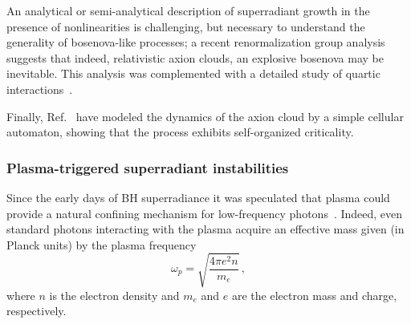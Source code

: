 \documentclass[11pt]{article}
\numberwithin{equation}{section} %
\begin{document}
An analytical or semi-analytical description of superradiant growth in the presence of nonlinearities is challenging, but necessary to understand the generality of bosenova-like processes;
a recent renormalization group analysis~\cite{Omiya:2020vji} suggests that indeed, relativistic axion clouds, an explosive bosenova may be inevitable. This analysis was complemented with a detailed study of quartic interactions~\cite{Baryakhtar:2020gao}.

Finally, Ref.~\cite{Mocanu:2012fd} have modeled the dynamics of the axion cloud by a simple cellular
automaton, showing that the process exhibits self-organized criticality.
\subsubsection{Plasma-triggered superradiant instabilities}\label{plasma-triggered}
Since the early days of BH superradiance it was speculated that plasma could provide a natural confining mechanism for 
low-frequency photons~\cite{teukolskythesis,Press:1972zz}. Indeed, even standard 
photons interacting with the plasma acquire an effective mass given (in Planck units) by the plasma 
frequency~\cite{Sitenko:1967,Kulsrud:1991jt}
%
\begin{equation}
\omega_p=\sqrt{\frac{4\pi e^2 n}{m_e}}\,,\label{plasma_freq}
\end{equation}
%
where $n$ is the electron density and $m_e$ and $e$ are the electron mass and charge, respectively. 
\end{document}
